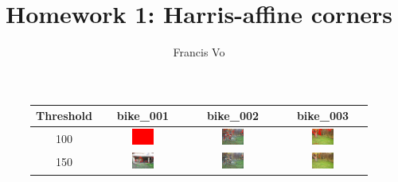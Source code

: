 \documentclass[a4paper,10pt]{article}
\title{Homework 1: Harris-affine corners}
\author{Francis Vo}
\begin{document}
\maketitle

\begin{figure}[h!]
    \begin{center}
		\begin{tabular}{ | c | c | c | c | }
		\hline
		Threshold & bike\_001 & bike\_002 & bike\_003 \\ \hline
		100 & \includegraphics[width=0.27\textwidth]{bike_001_100.png} & \includegraphics[width=0.27\textwidth]{bike_002_100.png} & \includegraphics[width=0.27\textwidth]{bike_003_100.png} \\ \hline
		150 & \includegraphics[width=0.27\textwidth]{bike_001_150.png} & \includegraphics[width=0.27\textwidth]{bike_002_150.png} & \includegraphics[width=0.27\textwidth]{bike_003_150.png} \\ \hline

\end{tabular}
\end{center}
\end{figure}
\end{document}
